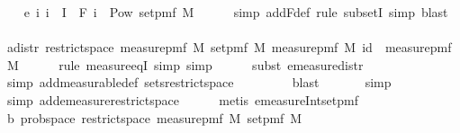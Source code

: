 \begin{isabellebody}
\isanewline
\ \ \isamarkupfalse%
\ e{\isacharcolon}{\kern0pt}\ {\isachardoublequoteopen}{\isasymAnd}i{\isachardot}{\kern0pt}\ i\ {\isasymin}\ I\ {\isasymLongrightarrow}\ F\ i\ {\isasymsubseteq}\ Pow\ {\isacharparenleft}{\kern0pt}set{\isacharunderscore}{\kern0pt}pmf\ M{\isacharparenright}{\kern0pt}{\isachardoublequoteclose}\isanewline
\ \ \ \ \isamarkupfalse%
\ {\isacharparenleft}{\kern0pt}simp\ add{\isacharcolon}{\kern0pt}F{\isacharunderscore}{\kern0pt}def{\isacharcomma}{\kern0pt}\ rule\ subsetI{\isacharcomma}{\kern0pt}\ simp{\isacharcomma}{\kern0pt}\ blast{\isacharparenright}{\kern0pt}\isanewline
\isanewline
\ \ \isamarkupfalse%
\ a{\isacharcolon}{\kern0pt}{\isachardoublequoteopen}distr\ {\isacharparenleft}{\kern0pt}restrict{\isacharunderscore}{\kern0pt}space\ {\isacharparenleft}{\kern0pt}measure{\isacharunderscore}{\kern0pt}pmf\ M{\isacharparenright}{\kern0pt}\ {\isacharparenleft}{\kern0pt}set{\isacharunderscore}{\kern0pt}pmf\ M{\isacharparenright}{\kern0pt}{\isacharparenright}{\kern0pt}\ {\isacharparenleft}{\kern0pt}measure{\isacharunderscore}{\kern0pt}pmf\ M{\isacharparenright}{\kern0pt}\ id\ {\isacharequal}{\kern0pt}\ measure{\isacharunderscore}{\kern0pt}pmf\ M{\isachardoublequoteclose}\isanewline
\ \ \ \ \isamarkupfalse%
\ {\isacharparenleft}{\kern0pt}rule\ measure{\isacharunderscore}{\kern0pt}eqI{\isacharcomma}{\kern0pt}\ simp{\isacharcomma}{\kern0pt}\ simp{\isacharparenright}{\kern0pt}\isanewline
\ \ \ \ \isamarkupfalse%
\ {\isacharparenleft}{\kern0pt}subst\ emeasure{\isacharunderscore}{\kern0pt}distr{\isacharparenright}{\kern0pt}\isanewline
\ \ \ \ \isamarkupfalse%
\ {\isacharparenleft}{\kern0pt}simp\ add{\isacharcolon}{\kern0pt}measurable{\isacharunderscore}{\kern0pt}def\ sets{\isacharunderscore}{\kern0pt}restrict{\isacharunderscore}{\kern0pt}space{\isacharparenright}{\kern0pt}\ \isanewline
\ \ \ \ \ \ \isamarkupfalse%
\ blast\isanewline
\ \ \ \ \ \isamarkupfalse%
\ simp\isanewline
\ \ \ \ \isamarkupfalse%
\ {\isacharparenleft}{\kern0pt}simp\ add{\isacharcolon}{\kern0pt}emeasure{\isacharunderscore}{\kern0pt}restrict{\isacharunderscore}{\kern0pt}space{\isacharparenright}{\kern0pt}\isanewline
\ \ \ \ \isamarkupfalse%
\ {\isacharparenleft}{\kern0pt}metis\ emeasure{\isacharunderscore}{\kern0pt}Int{\isacharunderscore}{\kern0pt}set{\isacharunderscore}{\kern0pt}pmf{\isacharparenright}{\kern0pt}\isanewline
\isanewline
\ \ \isamarkupfalse%
\ b{\isacharcolon}{\kern0pt}\ {\isachardoublequoteopen}prob{\isacharunderscore}{\kern0pt}space\ {\isacharparenleft}{\kern0pt}restrict{\isacharunderscore}{\kern0pt}space\ {\isacharparenleft}{\kern0pt}measure{\isacharunderscore}{\kern0pt}pmf\ M{\isacharparenright}{\kern0pt}\ {\isacharparenleft}{\kern0pt}set{\isacharunderscore}{\kern0pt}pmf\ M{\isacharparenright}{\kern0pt}{\isacharparenright}{\kern0pt}{\isachardoublequoteclose}\isanewline

\end{isabellebody}
